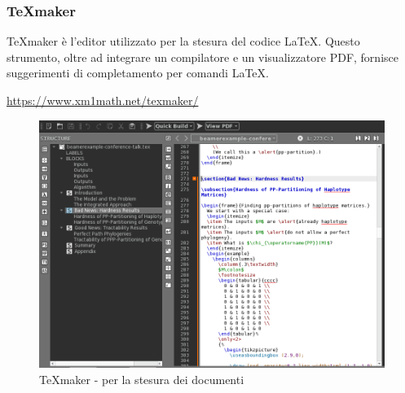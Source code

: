 \subsubsection{\TeX{}maker}
\TeX{}maker è l'editor utilizzato per la stesura del codice \LaTeX{}. Questo strumento, oltre ad integrare un compilatore e un visualizzatore PDF, fornisce suggerimenti di completamento per comandi \LaTeX{}. \\
\centerline{\url{https://www.xm1math.net/texmaker/}}
\begin{figure}[H]
	\includegraphics[width=0.99\linewidth]{../Norme_di_progetto/img/texMaker.png}
	\caption{\TeX{}maker - per la stesura dei documenti}
\end{figure}

